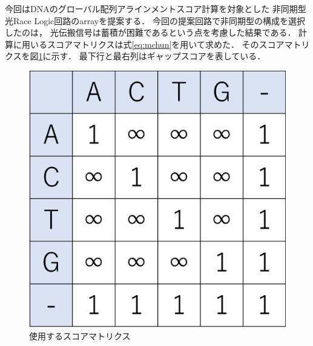 今回はDNAのグローバル配列アラインメントスコア計算を対象とした
非同期型光Race Logic回路のarrayを提案する．
今回の提案回路で非同期型の構成を選択したのは，
光伝搬信号は蓄積が困難であるという点を考慮した結果である．
計算に用いるスコアマトリクスは式\ref{eq:mchun}を用いて求めた．
そのスコアマトリクスを図\ref{fig:scorematrix_3}に示す．
最下行と最右列はギャップスコアを表している．
\begin{figure}[t!]
\begin{center}
\includegraphics[keepaspectratio,scale=0.4]{fig/3/scorematrix.eps}
\caption{使用するスコアマトリクス}
\label{fig:scorematrix_3}
\end{center}
\end{figure}

